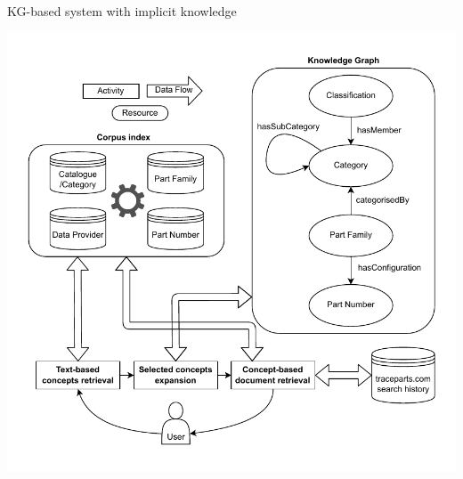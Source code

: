 \begin{frame}{KG-based system with implicit knowledge}

        \begin{center}
            \includegraphics[scale=0.5]{images/tp-expe-kg-based-search-hist-sys-legende.pdf} 
    \end{center}

\end{frame}


